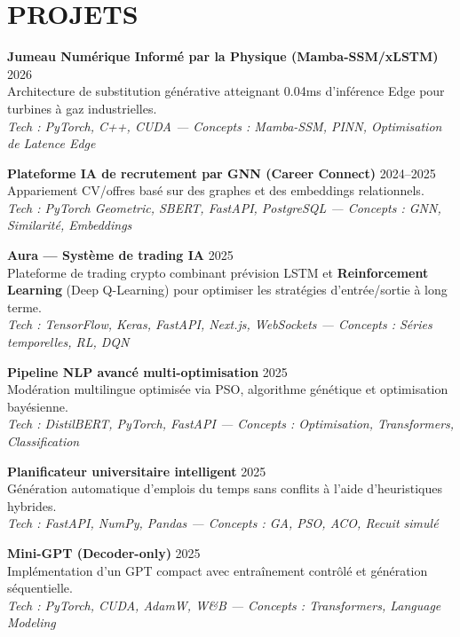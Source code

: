 \documentclass[a4paper,12pt]{article}
\begin{document}
\newpage

\section{PROJETS}
\setlength{\parskip}{13pt}
{\small

\textbf{Jumeau Numérique Informé par la Physique (Mamba-SSM/xLSTM)} \hfill 2026 \\
Architecture de substitution générative atteignant 0.04ms d'inférence Edge pour turbines à gaz industrielles. \\
\textit{Tech : PyTorch, C++, CUDA — Concepts : Mamba-SSM, PINN, Optimisation de Latence Edge}

\textbf{Plateforme IA de recrutement par GNN (Career Connect)} \hfill 2024--2025 \\
Appariement CV/offres basé sur des graphes et des embeddings relationnels. \\
\textit{Tech : PyTorch Geometric, SBERT, FastAPI, PostgreSQL — Concepts : GNN, Similarité, Embeddings}

\textbf{Aura — Système de trading IA} \hfill 2025 \\
Plateforme de trading crypto combinant prévision LSTM et \textbf{Reinforcement Learning} (Deep Q-Learning) pour optimiser les stratégies d’entrée/sortie à long terme. \\
\textit{Tech : TensorFlow, Keras, FastAPI, Next.js, WebSockets — Concepts : Séries temporelles, RL, DQN}

\textbf{Pipeline NLP avancé multi-optimisation} \hfill 2025 \\
Modération multilingue optimisée via PSO, algorithme génétique et optimisation bayésienne. \\
\textit{Tech : DistilBERT, PyTorch, FastAPI — Concepts : Optimisation, Transformers, Classification}

\textbf{Planificateur universitaire intelligent} \hfill 2025 \\
Génération automatique d’emplois du temps sans conflits à l’aide d’heuristiques hybrides. \\
\textit{Tech : FastAPI, NumPy, Pandas — Concepts : GA, PSO, ACO, Recuit simulé}

\textbf{Mini-GPT (Decoder-only)} \hfill 2025 \\
Implémentation d’un GPT compact avec entraînement contrôlé et génération séquentielle. \\
\textit{Tech : PyTorch, CUDA, AdamW, W\&B — Concepts : Transformers, Language Modeling}

}
\end{document}
